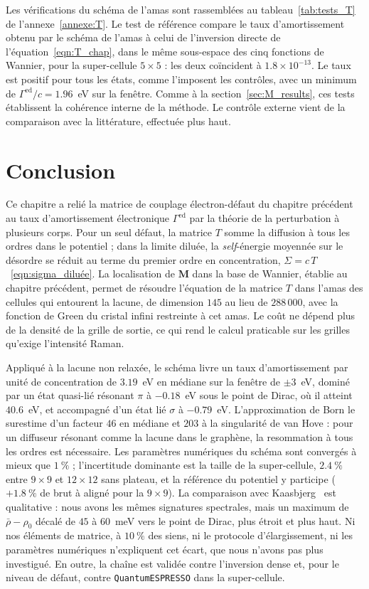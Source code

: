 \bigskip
{}

Les vérifications du schéma de l'amas sont rassemblées au tableau~\ref{tab:tests_T} de l'annexe~\ref{annexe:T}. Le test de référence compare le taux d'amortissement obtenu par le schéma de l'amas à celui de l'inversion directe de l'équation~\eqref{eqn:T_chap}, dans le même sous-espace des cinq fonctions de Wannier, pour la super-cellule $5\times5$ : les deux coïncident à $1.8\times10^{-13}$. Le taux est positif pour tous les états, comme l'imposent les contrôles, avec un minimum de $\Gamma^\text{ed}/c=1.96$~eV sur la fenêtre. Comme à la section~\ref{sec:M_results}, ces tests établissent la cohérence interne de la méthode. Le contrôle externe vient de la comparaison avec la littérature, effectuée plus haut.

\section{Conclusion}

Ce chapitre a relié la matrice de couplage électron-défaut du chapitre précédent au taux d'amortissement électronique $\Gamma^\text{ed}$ par la théorie de la perturbation à plusieurs corps. Pour un seul défaut, la matrice $T$ somme la diffusion à tous les ordres dans le potentiel ; dans la limite diluée, la \textit{self}-énergie moyennée sur le désordre se réduit au terme du premier ordre en concentration, $\Sigma=c\,T$~\eqref{eqn:sigma_diluée}. La localisation de $\bm M$ dans la base de Wannier, établie au chapitre précédent, permet de résoudre l'équation de la matrice $T$ dans l'amas des cellules qui entourent la lacune, de dimension $145$ au lieu de $288\,000$, avec la fonction de Green du cristal infini restreinte à cet amas. Le coût ne dépend plus de la densité de la grille de sortie, ce qui rend le calcul praticable sur les grilles qu'exige l'intensité Raman.

Appliqué à la lacune non relaxée, le schéma livre un taux d'amortissement par unité de concentration de $3.19$~eV en médiane sur la fenêtre de $\pm3$~eV, dominé par un état quasi-lié résonant $\pi$ à $-0.18$~eV sous le point de Dirac, où il atteint $40.6$~eV, et accompagné d'un état lié $\sigma$ à $-0.79$~eV. L'approximation de Born le surestime d'un facteur $46$ en médiane et $203$ à la singularité de van Hove : pour un diffuseur résonant comme la lacune dans le graphène, la resommation à tous les ordres est nécessaire. Les paramètres numériques du schéma sont convergés à mieux que $1~\%$ ; l'incertitude dominante est la taille de la super-cellule, $2.4~\%$ entre $9\times9$ et $12\times12$ sans plateau, et la référence du potentiel y participe ($+1.8~\%$ de brut à aligné pour la $9\times9$). La comparaison avec Kaasbjerg~\cite{kaasbjergAtomisticMatrixTheory2020} est qualitative : nous avons les mêmes signatures spectrales, mais un maximum de $\bar\rho-\rho_0$ décalé de $45$ à $60$~meV vers le point de Dirac, plus étroit et plus haut. Ni nos éléments de matrice, à $10~\%$ des siens, ni le protocole d'élargissement, ni les paramètres numériques n'expliquent cet écart, que nous n'avons pas plus investigué. En outre, la chaîne est validée contre l'inversion dense et, pour le niveau de défaut, contre \texttt{QuantumESPRESSO} dans la super-cellule.

